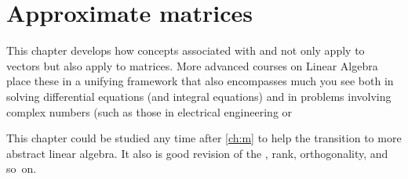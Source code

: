 
\chapter{Approximate matrices}
\label{ch:am}

\minitoc



This chapter 
develops how concepts associated with  and  not only apply to vectors but also apply to matrices.  
More advanced courses on Linear Algebra place these in a unifying framework that also encompasses much you see both in solving differential equations (and integral equations) and in problems involving complex numbers (such as those in electrical engineering or 

This chapter could be studied any time after \cref{ch:m} to help the transition to more abstract linear algebra.  
It also is good revision of the \svd, rank, orthogonality, and so~on.



\begin{comment} 
Huge applications of \svd{}s to video compression, experimental errors, and other areas.
Introduce digital \idx{image compression} by \svd{}s \pooliv{p.607--8} \holti{p.336--7}  \cite[\S07]{Davis99a}.
\cite{Higham86} mentions applications of \idx{polar decomposition} to the Orthogonal Procrustes problem.
\end{comment}







\endinput

